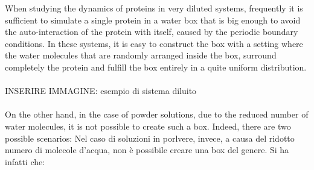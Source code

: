 When studying the dynamics of proteins in very diluted systems, frequently it is sufficient to simulate a single protein in a water box that is big enough to avoid the auto-interaction of the protein with itself, caused by the periodic boundary conditions. In these systems, it is easy to construct the box with a setting where the water molecules that are randomly arranged inside the box, surround completely the protein and fulfill the box entirely in a quite uniform distribution.\\
\\
INSERIRE IMMAGINE: esempio di sistema diluito\\
\\
On the other hand, in the case of powder solutions, due to the reduced number of water molecules, it is not possible to create such a box. Indeed, there are two possible scenarios:
Nel caso di soluzioni in porlvere, invece, a causa del ridotto numero di molecole d'acqua, non è possibile creare una box del genere. Si ha infatti che:
